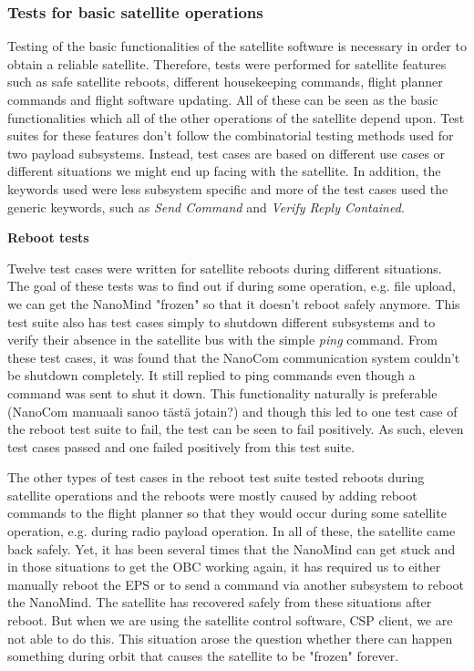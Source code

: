 \documentclass[english,12pt,a4paper,pdftex,elec,utf8]{aaltothesis}
\begin{document}
\subsubsection{Tests for basic satellite operations}
Testing of the basic functionalities of the satellite software is necessary in order to obtain a reliable satellite. Therefore, tests were performed for satellite features such as safe satellite reboots, different housekeeping commands, flight planner commands and flight software updating. All of these can be seen as the basic functionalities which all of the other operations of the satellite depend upon. Test suites for these features don't follow the combinatorial testing methods used for two payload subsystems. Instead, test cases are based on different use cases or different situations we might end up facing with the satellite. In addition, the keywords used were less subsystem specific and more of the test cases used the generic keywords, such as \textit{Send Command} and \textit{Verify Reply Contained}.\par
\textbf{Reboot tests}
\par 
Twelve test cases were written for satellite reboots during different situations. The goal of these tests was to find out if during some operation, e.g. file upload, we can get the NanoMind "frozen" so that it doesn't reboot safely anymore. This test suite also has test cases simply to shutdown different subsystems and to verify their absence in the satellite bus with the simple \textit{ping} command. From these test cases, it was found that the NanoCom communication system couldn't be shutdown completely. It still replied to ping commands even though a command was sent to shut it down. This functionality naturally is preferable (NanoCom manuaali sanoo tästä jotain?) and though this led to one test case of the reboot test suite to fail, the test can be seen to fail positively. As such, eleven test cases passed and one failed positively from this test suite. \par
The other types of test cases in the reboot test suite tested reboots during satellite operations and the reboots were mostly caused by adding reboot commands to the flight planner so that they would occur during some satellite operation, e.g. during radio payload operation. In all of these, the satellite came back safely. Yet, it has been several times that the NanoMind can get stuck and in those situations to get the OBC working again, it has required us to either manually reboot the EPS or to send a command via another subsystem to reboot the NanoMind. The satellite has recovered safely from these situations after reboot. But when we are using the satellite control software, CSP client, we are not able to do this. This situation arose the question whether there can happen something during orbit that causes the satellite to be "frozen" forever.\par
\end{document}
